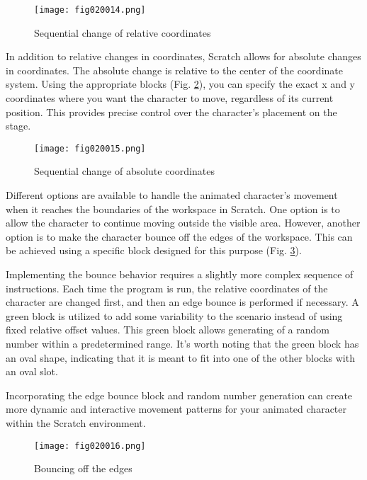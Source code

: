 \begin{figure}[H]
   \centering
   \texttt{[image: fig020014.png]}
   \caption{Sequential change of relative coordinates}
\label{fig020014}
\end{figure}

In addition to relative changes in coordinates, Scratch allows for absolute changes in coordinates. The absolute change is relative to the center of the coordinate system. Using the appropriate blocks (Fig. \ref{fig020015}), you can specify the exact x and y coordinates where you want the character to move, regardless of its current position. This provides precise control over the character's placement on the stage.

\begin{figure}[H]
   \centering
   \texttt{[image: fig020015.png]}
   \caption{Sequential change of absolute coordinates}
\label{fig020015}
\end{figure}

Different options are available to handle the animated character's movement when it reaches the boundaries of the workspace in Scratch. One option is to allow the character to continue moving outside the visible area. However, another option is to make the character bounce off the edges of the workspace. This can be achieved using a specific block designed for this purpose (Fig. \ref{fig020016}).

Implementing the bounce behavior requires a slightly more complex sequence of instructions. Each time the program is run, the relative coordinates of the character are changed first, and then an edge bounce is performed if necessary. A green block is utilized to add some variability to the scenario instead of using fixed relative offset values. This green block allows generating of a random number within a predetermined range. It's worth noting that the green block has an oval shape, indicating that it is meant to fit into one of the other blocks with an oval slot.

Incorporating the edge bounce block and random number generation can create more dynamic and interactive movement patterns for your animated character within the Scratch environment.

\begin{figure}[H]
   \centering
   \texttt{[image: fig020016.png]}
   \caption{Bouncing off the edges}
\label{fig020016}
\end{figure}

